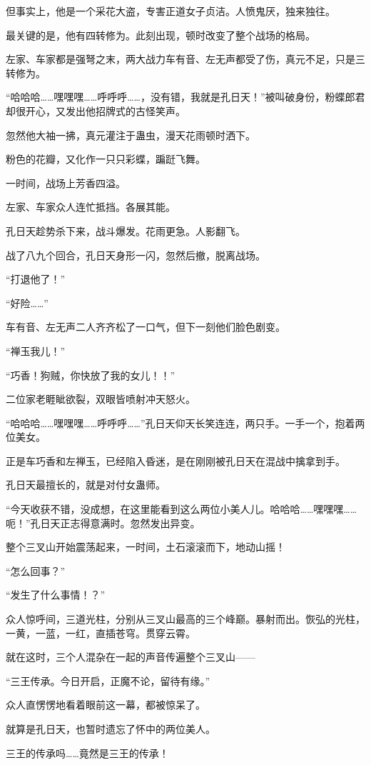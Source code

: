 \begin{this_body}
但事实上，他是一个采花大盗，专害正道女子贞洁。人愤鬼厌，独来独往。

最关键的是，他有四转修为。此刻出现，顿时改变了整个战场的格局。

左家、车家都是强弩之末，两大战力车有音、左无声都受了伤，真元不足，只是三转修为。

“哈哈哈……嘿嘿嘿……呼呼呼……，没有错，我就是孔日天！”被叫破身份，粉蝶郎君却很开心，又发出他招牌式的古怪笑声。

忽然他大袖一拂，真元灌注于蛊虫，漫天花雨顿时洒下。

粉色的花瓣，又化作一只只彩蝶，蹁跹飞舞。

一时间，战场上芳香四溢。

左家、车家众人连忙抵挡。各展其能。

孔日天趁势杀下来，战斗爆发。花雨更急。人影翻飞。

战了八九个回合，孔日天身形一闪，忽然后撤，脱离战场。

“打退他了！”

“好险……”

车有音、左无声二人齐齐松了一口气，但下一刻他们脸色剧变。

“禅玉我儿！”

“巧香！狗贼，你快放了我的女儿！！”

二位家老睚眦欲裂，双眼皆喷射冲天怒火。

“哈哈哈……嘿嘿嘿……呼呼呼……”孔日天仰天长笑连连，两只手。一手一个，抱着两位美女。

正是车巧香和左禅玉，已经陷入昏迷，是在刚刚被孔日天在混战中擒拿到手。

孔日天最擅长的，就是对付女蛊师。

“今天收获不错，没成想，在这里能看到这么两位小美人儿。哈哈哈……嘿嘿嘿……呃！”孔日天正志得意满时。忽然发出异变。

整个三叉山开始震荡起来，一时间，土石滚滚而下，地动山摇！

“怎么回事？”

“发生了什么事情！？”

众人惊呼间，三道光柱，分别从三叉山最高的三个峰巅。暴射而出。恢弘的光柱，一黄，一蓝，一红，直插苍穹。贯穿云霄。

就在这时，三个人混杂在一起的声音传遍整个三叉山——

“三王传承。今日开启，正魔不论，留待有缘。”

众人直愣愣地看着眼前这一幕，都被惊呆了。

就算是孔日天，也暂时遗忘了怀中的两位美人。

三王的传承吗……竟然是三王的传承！


\end{this_body}

